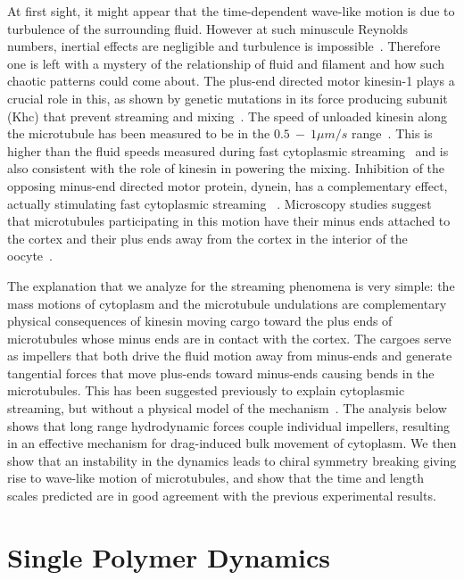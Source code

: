 \documentclass[11pt]{ucthesis}
\begin{document}
At first sight, it might appear that the time-dependent wave-like
motion is due to turbulence of the surrounding fluid. However at such minuscule Reynolds
numbers, inertial effects are negligible and turbulence is
impossible~\cite{BergRandomWalksinBiology}. Therefore one is left with a mystery of
the relationship of fluid and filament and
how such chaotic patterns could come about. The plus-end
directed motor kinesin-1 plays a crucial role in this, as
shown by 
genetic mutations in its force producing subunit (Khc)  that prevent streaming and mixing~\cite{SerbusSaxton}.
The speed of unloaded kinesin along the microtubule has been
measured to be in the $0.5 ~-~ 1 \mu m/s$ range~\cite{SvobodaBlock,MeyhoferHoward}.  This is higher
than the fluid speeds measured during fast cytoplasmic streaming~\cite{SerbusSaxton}
and is also consistent with the role of kinesin in powering
the mixing.
Inhibition of the opposing minus-end directed motor protein,
dynein, has a complementary effect,
actually stimulating fast cytoplasmic streaming ~\cite{SerbusSaxton}.  Microscopy studies
suggest that microtubules participating in this motion have their
minus ends attached to the cortex and their plus ends away from
the cortex in the interior of the oocyte~\cite{SerbusSaxton,ChaSerbus}.  

The explanation
that we analyze for the streaming phenomena is very simple: the
mass motions of cytoplasm and the microtubule undulations are complementary
physical consequences of kinesin moving cargo 
toward the plus ends of microtubules whose minus ends
are in contact with the cortex. The cargoes serve as impellers that
both drive the fluid motion away from minus-ends and generate
tangential forces that move plus-ends toward minus-ends causing
bends in the microtubules. This has been suggested previously to
explain cytoplasmic streaming, but without a physical model of the
mechanism~\cite{SerbusSaxton}. The analysis below shows that long range hydrodynamic
forces couple individual impellers, resulting in an effective
mechanism for drag-induced bulk movement of cytoplasm.  We then
show that an instability in the dynamics leads to chiral symmetry breaking giving rise to
wave-like motion of microtubules, and show that the time and length scales
predicted are in good agreement with the previous experimental
results.

\chapter{Single Polymer Dynamics}
\end{document}
